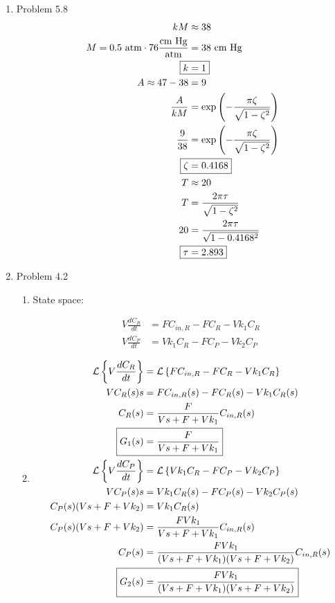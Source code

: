 \documentclass[12pt]{article}
\begin{document}
\begin{enumerate}
\newpage
\item Problem 5.8
\begin{align*}
    kM &\approx 38 \\
    M = 0.5 \text{ atm} \cdot 76 \frac{\text{cm Hg}}{\mathrm{atm}} &= 38 \text{ cm Hg} \\
    \Aboxed{k &= 1} \\
    A \approx 47 - 38 &= 9 \\
    \frac{A}{kM} &= \exp{\left(-\frac{\pi\zeta}{\sqrt{1 - \zeta^2}}\right)} \\
    \frac{9}{38} &= \exp{\left(-\frac{\pi\zeta}{\sqrt{1 - \zeta^2}}\right)} \\
    \Aboxed{\zeta &= 0.4168} \\
    T &\approx 20 \\
    T &= \frac{2\pi\tau}{\sqrt{1 - \zeta^2}} \\
    20 &= \frac{2\pi\tau}{\sqrt{1 - 0.4168^2}} \\
    \Aboxed{\tau &= 2.893}
\end{align*}

\newpage
\item Problem 4.2

\begin{enumerate}
    \item 
    
    State space:

    \begin{align*}
        V \frac{dC_R}{dt} &= F C_{in,R} - F C_R - V k_1 C_R \\
        V \frac{dC_P}{dt} &= V k_1 C_R - F C_P - V k_2 C_P
    \end{align*}
    
    
    \item
    \begin{align*}
        \mathcal{L}\left\{V \frac{dC_R}{dt}\right\} &= \mathcal{L}\left\{F C_{in,R} - F C_R - V k_1 C_R\right\} \\
        V C_R(s) s &= F C_{in,R}(s) - F C_R(s) - Vk_1C_R(s) \\
        C_R(s) &= \frac{F}{Vs + F + Vk_1} C_{in,R}(s) \\
        \Aboxed{G_1(s) &= \frac{F}{Vs + F + Vk_1}} \\
        \mathcal{L}\left\{V \frac{dC_P}{dt}\right\} &= \mathcal{L}\left\{V k_1 C_R - F C_P - V k_2 C_P\right\} \\
        V C_P(s) s &= V k_1 C_R(s) - F C_P(s) - V k_2 C_P(s) \\
        C_P(s) (V s + F + V k_2) &= V k_1 C_R(s) \\
        C_P(s) (V s + F + V k_2) &= \frac{F V k_1}{Vs + F + Vk_1} C_{in,R}(s) \\
        C_P(s) &= \frac{F V k_1}{(Vs + F + Vk_1) (V s + F + V k_2)} C_{in,R}(s) \\
        \Aboxed{G_2(s) &= \frac{F V k_1}{(Vs + F + Vk_1) (V s + F + V k_2)}}
    \end{align*}


\end{enumerate}
\end{enumerate}
\end{document}
